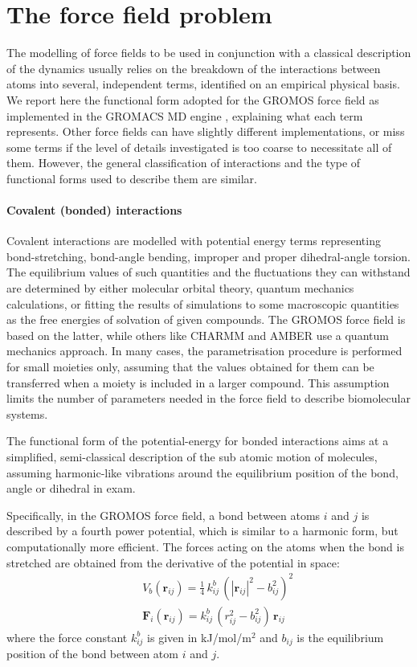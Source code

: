 \section{The force field problem} \label{sec:ff}

The modelling of force fields to be used in conjunction with a classical description of the dynamics usually relies on the breakdown of the interactions between atoms into several, independent terms, identified on an empirical physical basis. We report here the functional form adopted for the GROMOS force field \cite{Oostenbrink2004,Schmid2011} as implemented in the GROMACS MD engine \cite{Berendsen1995,Abraham2015,gromacs_man}, explaining what each term represents. Other force fields can have slightly different implementations, or miss some terms if the level of details investigated is too coarse to necessitate all of them. However, the general classification of interactions and the type of functional forms used to describe them are similar.

\paragraph{Covalent (bonded) interactions} Covalent interactions are modelled with potential energy terms representing bond-stretching, bond-angle bending, improper and proper dihedral-angle torsion. The equilibrium values of such quantities and the fluctuations they can withstand are determined by either molecular orbital theory, quantum mechanics calculations, or fitting the results of simulations to some macroscopic quantities as the free energies of solvation of given compounds. The GROMOS force field is based on the latter, while others like CHARMM \cite{MacKerell1998,Klauda2010} and AMBER \cite{Maier2015} use a quantum mechanics approach.
%
In many cases, the parametrisation procedure is performed for small moieties only, assuming that the values obtained for them can be transferred when a moiety is included in a larger compound. This assumption limits the number of parameters needed in the force field to describe biomolecular systems.

The functional form of the potential-energy for bonded interactions aims at a simplified, semi-classical description of the sub atomic motion of molecules, assuming harmonic-like vibrations around the equilibrium position of the bond, angle or dihedral in exam.

Specifically, in the GROMOS force field, a bond between atoms $i$ and $j$ is described by a fourth power potential, which is similar to a harmonic form, but computationally more efficient. The forces acting on the atoms when the bond is stretched are obtained from the derivative of the potential in space:
\begin{eqnarray}
&& V_b(\textbf{r}_{ij}) = \frac{1}{4}\,k^b_{ij}\,\left(|\textbf{r}_{ij}|^2 - b_{ij}^2\right)^2 \\
&& \textbf{F}_i(\textbf{r}_{ij}) = k^b_{ij}\,\left(r_{ij}^2 - b_{ij}^2\right)\,\textbf{r}_{ij}
\end{eqnarray}
where the force constant $k^b_{ij}$ is given in kJ/mol/m$^2$ and $b_{ij}$ is the equilibrium position of the bond between atom $i$ and $j$.


